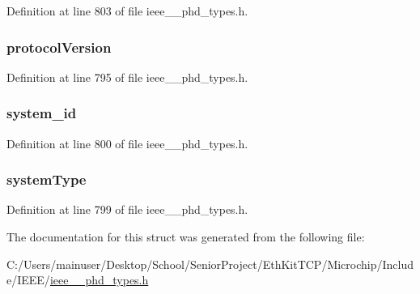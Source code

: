 Definition at line 803 of file ieee\+\_\+\_\+phd\+\_\+types.\+h.

\hypertarget{struct___phd_association_information_a55b9aedc30d70a00073db94c28e4f74d}{}
\subsubsection[{protocol\+Version}]{ protocol\+Version}\label{struct___phd_association_information_a55b9aedc30d70a00073db94c28e4f74d}


Definition at line 795 of file ieee\+\_\+\_\+phd\+\_\+types.\+h.

\hypertarget{struct___phd_association_information_a2833aa79f11958342107da7209c3366b}{}
\subsubsection[{system\+\_\+id}]{ system\+\_\+id}\label{struct___phd_association_information_a2833aa79f11958342107da7209c3366b}


Definition at line 800 of file ieee\+\_\+\_\+phd\+\_\+types.\+h.

\hypertarget{struct___phd_association_information_a5aaa528bf8358a0698d9c4f502b210d9}{}
\subsubsection[{system\+Type}]{ system\+Type}\label{struct___phd_association_information_a5aaa528bf8358a0698d9c4f502b210d9}


Definition at line 799 of file ieee\+\_\+\_\+phd\+\_\+types.\+h.



The documentation for this struct was generated from the following file\+:\begin{DoxyCompactItemize}
\item 
C\+:/\+Users/mainuser/\+Desktop/\+School/\+Senior\+Project/\+Eth\+Kit\+T\+C\+P/\+Microchip/\+Include/\+I\+E\+E\+E/\hyperlink{ieee__11073__phd__types_8h}{ieee\+\_\+\_\+phd\+\_\+types.\+h}\end{DoxyCompactItemize}
